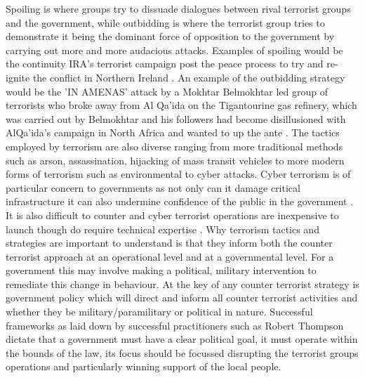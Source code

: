 Spoiling is where groups try to dissuade dialogues between rival terrorist groups and the government, while outbidding is where the terrorist group tries to demonstrate it being the dominant force of opposition to the government by carrying out more and more audacious attacks. Examples of spoiling would be the continuity IRA's terrorist campaign post the peace process to try and re-ignite the conflict in Northern Ireland \citep{whiting2015spoiling}. An example of the outbidding strategy would be the 'IN AMENAS' attack by a Mokhtar Belmokhtar led group of terrorists who broke away from Al Qa'ida on the Tigantourine gas refinery, which was carried out by Belmokhtar and his followers had become disillusioned with AlQa'ida's campaign in North Africa and wanted to up the ante \citep{watling2015ctc}. 
The tactics employed by terrorism are also diverse ranging from more traditional methods such as arson, assassination, hijacking of mass transit vehicles to more modern forms of terrorism such as environmental to cyber attacks. Cyber terrorism is of particular concern to governments as not only can it damage critical infrastructure it can also undermine confidence of the public in the government \citep{gross2016cyber}. It is also difficult to counter and cyber terrorist operations are inexpensive to launch though do require technical expertise \citep{blakemore2016policing}.
Why terrorism tactics and strategies are important to understand is that they inform both the counter terrorist approach at an operational level and at a governmental level.  For a government this may involve making a political, military intervention to remediate this change in behaviour. 
At the key of any counter terrorist strategy is government policy which will direct and inform all counter terrorist activities and whether they be military/paramilitary or political in nature. Successful frameworks as laid down by successful practitioners such as Robert Thompson dictate that a government must have a clear political goal, it must operate within the bounds of the law, its focus should be focussed disrupting the terrorist groups operations and particularly winning support of the local people. 

